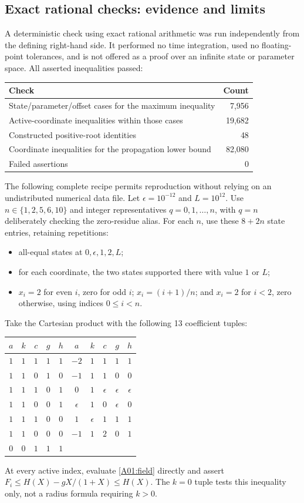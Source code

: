 \documentclass[11pt]{article}
\begin{document}
\subsection{Exact rational checks: evidence and limits}
A deterministic check using exact rational arithmetic was run independently
from the defining right-hand side. It performed no time integration,
used no floating-point tolerances, and is not offered as a proof over
an infinite state or parameter space. All asserted inequalities passed:
\begin{center}
\begin{tabular}{lr}
\toprule
Check & Count \\
\midrule
State/parameter/offset cases for the maximum inequality & 7,956 \\
Active-coordinate inequalities within those cases & 19,682 \\
Constructed positive-root identities & 48 \\
Coordinate inequalities for the propagation lower bound & 82,080 \\
Failed assertions & 0 \\
\bottomrule
\end{tabular}
\end{center}
The following complete recipe permits reproduction without relying on
an undistributed numerical data file. Let $\epsilon=10^{-12}$ and
$L=10^{12}$. Use $n\in\{1,2,5,6,10\}$ and integer representatives
$q=0,1,\ldots,n$, with $q=n$ deliberately checking the zero-residue alias.
For each $n$, use these $8+2n$ state entries, retaining repetitions:
\begin{itemize}
\item all-equal states at $0,\epsilon,1,2,L$;
\item for each coordinate, the two states supported there with value $1$ or $L$;
\item $x_i=2$ for even $i$, zero for odd $i$; $x_i=(i+1)/n$;
and $x_i=2$ for $i<2$, zero otherwise, using indices $0\leq i<n$.
\end{itemize}
Take the Cartesian product with the following 13 coefficient tuples:
\begin{center}
\begin{tabular}{ccccc@{\qquad}ccccc}
\toprule
$a$&$k$&$c$&$g$&$h$&$a$&$k$&$c$&$g$&$h$\\
\midrule
$1$&$1$&$1$&$1$&$1$&$-2$&$1$&$1$&$1$&$1$\\
$1$&$1$&$0$&$1$&$0$&$-1$&$1$&$1$&$0$&$0$\\
$1$&$1$&$1$&$0$&$1$&$0$&$1$&$\epsilon$&$\epsilon$&$\epsilon$\\
$1$&$1$&$0$&$0$&$1$&$\epsilon$&$1$&$0$&$\epsilon$&$0$\\
$1$&$1$&$1$&$0$&$0$&$1$&$\epsilon$&$1$&$1$&$1$\\
$1$&$1$&$0$&$0$&$0$&$-1$&$1$&$2$&$0$&$1$\\
$0$&$0$&$1$&$1$&$1$&&&&&\\
\bottomrule
\end{tabular}
\end{center}
At every active index, evaluate \eqref{A01:field} directly and assert
$F_i\leq H(X)-gX/(1+X)\leq H(X)$. The $k=0$ tuple tests this
inequality only, not a radius formula requiring $k>0$.
\end{document}

